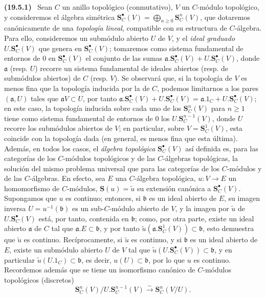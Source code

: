 \documentclass[10pt,oneside]{book}
\makeatletter
\newcommand{\setmanualcurrentlabel}[1]{\def\@currentlabel{#1}}
\newcommand{\oldpage}[2][]{%
  \setcounter{footnote}{0}%
  \marginpar{\scriptsize\textbf{#1}~|~#2}\ignorespaces}
\newenvironment{env}[1][]{\setmanualcurrentlabel{#1}\par\medskip\noindent\textbf{(#1)}\ }{\par}
\makeatother
\begin{document}
\begin{env}[19.5.1]
\label{0.19.5.1-es}
\oldpage[0\textsubscript{IV-1}]{90}
Sean $C$ un anillo topológico (conmutativo), $V$ un $C$-módulo topológico,
y consideremos el álgebra simétrica
$\mathbf S_C^\bullet(V)=\bigoplus_{n\geq0}\mathbf S_C^n(V)$, que dotaremos
canónicamente de una \emph{topología lineal}, compatible con su estructura de
$C$-álgebra. Para ello, consideremos un submódulo abierto $U$ de $V$, y
el \emph{ideal graduado} $U.\mathbf S_C^\bullet(V)$ que genera en
$\mathbf S_C^\bullet(V)$; tomaremos como sistema fundamental de entornos de
$0$ en $\mathbf S_C^\bullet(V)$ el conjunto de las sumas
$\mathfrak a.\mathbf S_C^\bullet(V)+U.\mathbf S_C^\bullet(V)$, donde $\mathfrak a$ (resp.
$U$) recorre un sistema fundamental de ideales abiertos (resp. de submódulos
abiertos) de $C$ (resp. $V$). Se observará que, si la topología de $V$ es menos
fina que la topología inducida por la de $C$, podemos limitarnos a los pares
$(\mathfrak a,U)$ tales que $\mathfrak aV\subset U$, por tanto
$\mathfrak a.\mathbf S_C^\bullet(V)+U.\mathbf S_C^\bullet(V)
=\mathfrak a.1_C+U.\mathbf S_C^\bullet(V)$; en este caso, la topología inducida sobre
cada uno de los $\mathbf S_C^n(V)$ para $n\geq1$ tiene como sistema fundamental de
entornos de $0$ los $U.\mathbf S_C^{n-1}(V)$, donde $U$ recorre los
submódulos abiertos de $V$; en particular, sobre $V=\mathbf S_C^1(V)$, esta
coincide con la topología dada (en general, es menos fina que esta
última). Además, en todos los casos, el \emph{álgebra topológica}
$\mathbf S_C^\bullet(V)$ así definida es, para las categorías de los $C$-módulos
topológicos y de las $C$-álgebras topológicas, la solución del mismo problema
universal que para las categorías de los $C$-módulos y de las $C$-álgebras. En efecto,
sea $E$ una $C$-álgebra topológica, $u:V\to E$ un homomorfismo de
$C$-módulos, $\mathbf S(u)=\widetilde u$ su extensión canónica a
$\mathbf S_C^\bullet(V)$. Supongamos que $u$ es continuo; entonces, si $\mathfrak b$ es un
ideal abierto de $E$, su imagen inversa $U=u^{-1}(\mathfrak b)$ es un
sub-$C$-módulo abierto de $V$, y la imagen por $\widetilde u$ de
$U.\mathbf S_C^\bullet(V)$ está, por tanto, contenida en $\mathfrak b$; como, por otra parte,
existe un ideal abierto $\mathfrak a$ de $C$ tal que
$\mathfrak a.E\subset\mathfrak b$, y por tanto
$\widetilde u(\mathfrak a.\mathbf S_C^1(V))\subset\mathfrak b$, esto demuestra
que $\widetilde u$ es continuo. Recíprocamente, si $\widetilde u$ es continuo,
y si $\mathfrak b$ es un ideal abierto de $E$, existe un submódulo abierto
$U$ de $V$ tal que $\widetilde u(U.\mathbf S_C^\bullet(V))\subset\mathfrak b$, y en
particular $\widetilde u(U.1_C)\subset\mathfrak b$, es decir,
$u(U)\subset\mathfrak b$, por lo que $u$ es continuo. Recordemos además que se tiene
un isomorfismo canónico de $C$-módulos topológicos (discretos)
\begin{equation}
\label{0.19.5.1.1-es}
  \mathbf S_C^n(V)/U.\mathbf S_C^{n-1}(V)
  \xrightarrow{\sim}\mathbf S_C^n(V/U).
  \tag{19.5.1.1}
\end{equation}
\end{env}
\end{document}

